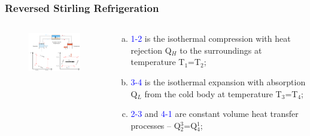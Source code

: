 \documentclass[10pt,compress]{beamer}
\begin{document}
\begin{frame}
 \frametitle{Reversed Stirling Refrigeration}
  \begin{columns}

   \begin{column}[c]{0.55\linewidth}
    \begin{figure}%
     \begin{center}
      \includegraphics[width=6.8cm,height=6.cm]{./Pics/Overview_Refrig9}
     \end{center}
    \end{figure}  
   \end{column}  

   \begin{column}[c]{0.45\linewidth}
    \begin{enumerate}[(a)]
     \item <1-> \textcolor{blue}{1-2} is the isothermal compression with heat rejection Q$_{H}$ to the surroundings at temperature T$_{1}$=T$_{2}$;
     \item <2-> \textcolor{blue}{3-4} is the isothermal expansion with absorption Q$_{L}$ from the cold body at temperature T$_{3}$=T$_{4}$;
     \item <3-> \textcolor{blue}{2-3} and \textcolor{blue}{4-1} are constant volume heat transfer processes -- Q$_{2}^{3}$=Q$_{4}^{1}$;
    \end{enumerate}
   \end{column}

  \end{columns}
\end{frame}
\end{document}
